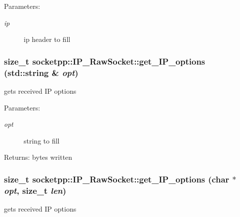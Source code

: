 \begin{Desc}
\item[Parameters:]
\begin{description}
\item[{\em ip}]ip header to fill \end{description}
\end{Desc}
\hypertarget{classsocketpp_1_1IP__RawSocket_c9bec0c1db60871bb1cb5560b97e02ed}{
\subsubsection[{get\_\-IP\_\-options}]{\setlength{\rightskip}{0pt plus 5cm}size\_\-t socketpp::IP\_\-RawSocket::get\_\-IP\_\-options (std::string \& {\em opt})}}
\label{classsocketpp_1_1IP__RawSocket_c9bec0c1db60871bb1cb5560b97e02ed}


gets received IP options 

\begin{Desc}
\item[Parameters:]
\begin{description}
\item[{\em opt}]string to fill \end{description}
\end{Desc}
\begin{Desc}
\item[Returns:]bytes written \end{Desc}
\hypertarget{classsocketpp_1_1IP__RawSocket_686fcc72997b0843b2ece0c4d8a5735d}{
\subsubsection[{get\_\-IP\_\-options}]{\setlength{\rightskip}{0pt plus 5cm}size\_\-t socketpp::IP\_\-RawSocket::get\_\-IP\_\-options (char $\ast$ {\em opt}, \/  size\_\-t {\em len})}}
\label{classsocketpp_1_1IP__RawSocket_686fcc72997b0843b2ece0c4d8a5735d}


gets received IP options 


